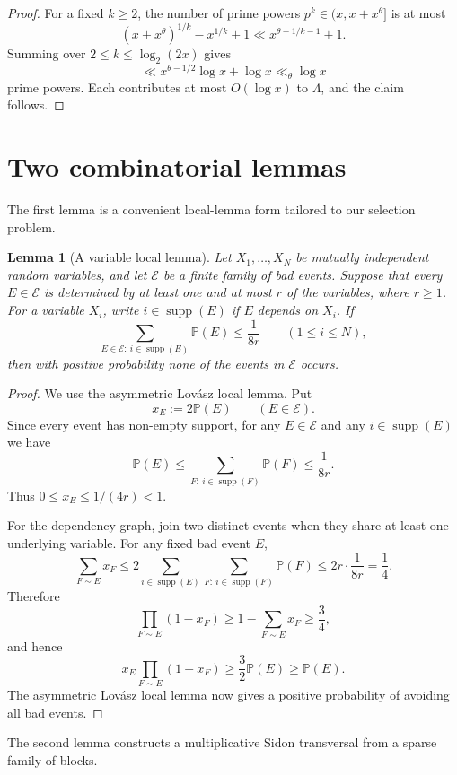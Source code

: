 \documentclass[11pt,reqno]{amsart}
\numberwithin{equation}{section}
\theoremstyle{plain}
\newtheorem{lemma}[theorem]{Lemma}
\theoremstyle{definition}
\DeclareMathOperator{\supp}{supp}
\begin{document}
\begin{proof}
For a fixed $k\ge2$, the number of prime powers $p^k\in(x,x+x^\theta]$ is at
most
\[
        (x+x^\theta)^{1/k}-x^{1/k}+1
        \ll x^{\theta+1/k-1}+1.
\]
Summing over $2\le k\le \log_2(2x)$ gives
\[
        \ll x^{\theta-1/2}\log x+\log x\ll_\theta \log x
\]
prime powers.  Each contributes at most $O(\log x)$ to $\Lambda$, and the claim
follows.
\end{proof}

\section{Two combinatorial lemmas}

The first lemma is a convenient local-lemma form tailored to our selection
problem.

\begin{lemma}[A variable local lemma]
\label{lem:variable-LLL}
Let $X_1,\ldots,X_N$ be mutually independent random variables, and let
$\mathcal E$ be a finite family of bad events.  Suppose that every
$E\in\mathcal E$ is determined by at least one and at most $r$ of the variables,
where $r\ge 1$.  For a variable $X_i$, write $i\in\supp(E)$ if $E$ depends on
$X_i$.  If
\[
        \sum_{E\in\mathcal E:\ i\in\supp(E)} \mathbb P(E) \le \frac1{8r}
        \qquad (1\le i\le N),
\]
then with positive probability none of the events in $\mathcal E$ occurs.
\end{lemma}

\begin{proof}
We use the asymmetric Lov\'asz local lemma.  Put
\[
        x_E:=2\mathbb P(E) \qquad (E\in\mathcal E).
\]
Since every event has non-empty support, for any \(E\in\mathcal E\) and any
\(i\in\supp(E)\) we have
\[
        \mathbb P(E)
        \le
        \sum_{F:\ i\in\supp(F)}\mathbb P(F)
        \le \frac1{8r}.
\]
Thus \(0\le x_E\le 1/(4r)<1\).

For the dependency graph, join two distinct events when they share at least one
underlying variable.  For any fixed bad event \(E\),
\[
        \sum_{F\sim E} x_F
        \le 2\sum_{i\in\supp(E)}
              \sum_{F:\ i\in\supp(F)} \mathbb P(F)
        \le 2r\cdot \frac1{8r}=\frac14.
\]
Therefore
\[
        \prod_{F\sim E}(1-x_F)
        \ge 1-\sum_{F\sim E}x_F
        \ge \frac34,
\]
and hence
\[
        x_E\prod_{F\sim E}(1-x_F)
        \ge \frac32\mathbb P(E)
        \ge \mathbb P(E).
\]
The asymmetric Lov\'asz local lemma now gives a positive probability of avoiding
all bad events.
\end{proof}
The second lemma constructs a multiplicative Sidon transversal from a sparse
family of blocks.
\end{document}
